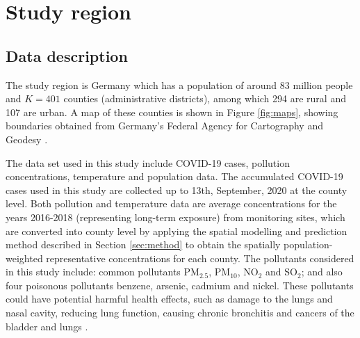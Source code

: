 \documentclass[12,]{article}
\begin{document}
\hypertarget{sec:studyRegion}{%
\section{Study region}\label{sec:studyRegion}}

\hypertarget{data-description}{%
\subsection{Data description}\label{data-description}}

The study region is Germany which has a population of around 83 million
people and \(K=401\) counties (administrative districts), among which
294 are rural and 107 are urban. A map of these counties is shown in
Figure \ref{fig:maps}, showing boundaries obtained from Germany's
Federal Agency for Cartography and Geodesy \autocite{BKG2020}.

The data set used in this study include COVID-19 cases, pollution
concentrations, temperature and population data. The accumulated
COVID-19 cases used in this study are collected up to 13th, September,
2020 at the county level. Both pollution and temperature data are
average concentrations for the years 2016-2018 (representing long-term
exposure) from monitoring sites, which are converted into county level
by applying the spatial modelling and prediction method described in
Section \ref{sec:method} to obtain the spatially population-weighted
representative concentrations for each county. The pollutants considered
in this study include: common pollutants PM\(_{2.5}\), PM\(_{10}\),
NO\(_{2}\) and SO\(_2\); and also four poisonous pollutants benzene,
arsenic, cadmium and nickel. These pollutants could have potential
harmful health effects, such as damage to the lungs and nasal cavity,
reducing lung function, causing chronic bronchitis and cancers of the
bladder and lungs \autocites{Yu2002}{Smith2010}{Jarup1998}{Das2008}.
\end{document}
